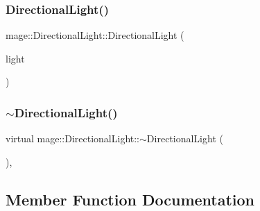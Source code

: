 \hypertarget{classmage_1_1_directional_light_a61dfbcff7faae4ec2f24b9d4f30c7720}{}\label{classmage_1_1_directional_light_a61dfbcff7faae4ec2f24b9d4f30c7720} 
\subsubsection{\texorpdfstring{Directional\+Light()}{DirectionalLight()}\hspace{0.1cm}{\footnotesize\ttfamily [3/3]}}
{\footnotesize\ttfamily mage\+::\+Directional\+Light\+::\+Directional\+Light (\begin{DoxyParamCaption}\item[{\hyperlink{classmage_1_1_directional_light}{Directional\+Light} \&\&}]{light }\end{DoxyParamCaption})\hspace{0.3cm}{\ttfamily [default]}}

\hypertarget{classmage_1_1_directional_light_a08f8d1a4b38d18aa4735ddda7d6e0f51}{}\label{classmage_1_1_directional_light_a08f8d1a4b38d18aa4735ddda7d6e0f51} 
\subsubsection{\texorpdfstring{$\sim$\+Directional\+Light()}{~DirectionalLight()}}
{\footnotesize\ttfamily virtual mage\+::\+Directional\+Light\+::$\sim$\+Directional\+Light (\begin{DoxyParamCaption}{ }\end{DoxyParamCaption})\hspace{0.3cm}{\ttfamily [virtual]}, {\ttfamily [default]}}



\subsection{Member Function Documentation}
\hypertarget{classmage_1_1_directional_light_a14e3816a550a992f1060de6da3b36dbf}{}\label{classmage_1_1_directional_light_a14e3816a550a992f1060de6da3b36dbf} 
